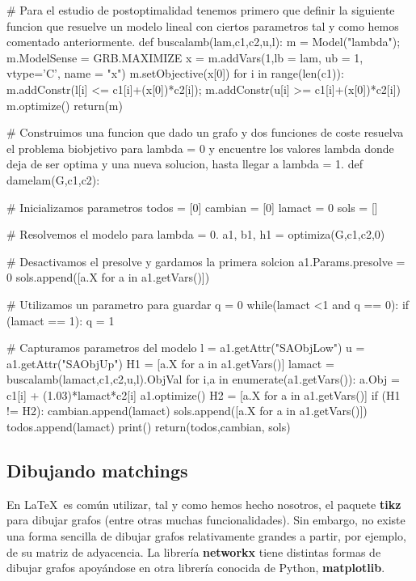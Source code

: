 \documentclass[twoside,a4paper,openright,12pt,tikz]{book}
\begin{document}
\begin{pythone}
# Para el estudio de postoptimalidad tenemos primero que definir la siguiente funcion que resuelve un modelo lineal con ciertos parametros tal y como hemos comentado anteriormente.
def buscalamb(lam,c1,c2,u,l):  
    m = Model("lambda");
    m.ModelSense = GRB.MAXIMIZE
    x = m.addVars(1,lb = lam, ub = 1, vtype='C', name = "x")
    m.setObjective(x[0])
    for i in range(len(c1)):
        m.addConstr(l[i] <= c1[i]+(x[0])*c2[i]);
        m.addConstr(u[i] >= c1[i]+(x[0])*c2[i])
    m.optimize()    
    return(m)
    

# Construimos una funcion que dado un grafo y dos funciones de coste resuelva el problema biobjetivo para lambda = 0 y encuentre los valores lambda donde deja de ser optima y una nueva solucion, hasta llegar a lambda = 1.
def damelam(G,c1,c2):
    
    # Inicializamos parametros
    todos = [0]
    cambian = [0]
    lamact = 0
    sols = []
    
    # Resolvemos el modelo para lambda = 0.
    a1, b1, h1 = optimiza(G,c1,c2,0)
    
    # Desactivamos el presolve y gardamos la primera solcion
    a1.Params.presolve = 0
    sols.append([a.X for a in a1.getVars()])
    
    # Utilizamos un parametro para guardar 
    q = 0
    while(lamact <1 and q == 0):
        if (lamact == 1):
            q = 1
            
        # Capturamos parametros del modelo
        l = a1.getAttr("SAObjLow")
        u = a1.getAttr("SAObjUp")
        H1 = [a.X for a in a1.getVars()]
        lamact = buscalamb(lamact,c1,c2,u,l).ObjVal
        for i,a in enumerate(a1.getVars()):
            a.Obj = c1[i] + (1.03)*lamact*c2[i]
        a1.optimize()
        H2 = [a.X for a in a1.getVars()]
        if (H1 != H2):
            cambian.append(lamact)
        sols.append([a.X for a in a1.getVars()])
        todos.append(lamact)
    print()
    return(todos,cambian, sols)
\end{pythone}
\newpage
\subsection{Dibujando matchings}
En \LaTeX\, es común utilizar, tal y como hemos hecho nosotros, el paquete \textbf{tikz} para dibujar grafos (entre otras muchas funcionalidades). Sin embargo, no existe una forma sencilla de dibujar grafos relativamente grandes a partir, por ejemplo, de su matriz de adyacencia. La librería \textbf{networkx} tiene distintas formas de dibujar grafos apoyándose en otra librería conocida de Python, \textbf{matplotlib}. 
\end{document}
